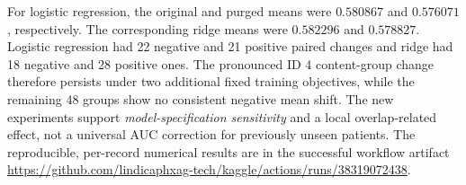 For logistic regression, the original and purged
means were $0.580867$ and $0.576071$,
respectively. The corresponding ridge means were
$0.582296$ and $0.578827$. Logistic regression
had 22 negative and 21 positive paired changes
and ridge had 18 negative and 28 positive ones.
The pronounced ID 4 content-group change
therefore persists under two additional fixed
training objectives, while the remaining
48 groups show no consistent negative mean shift.
The new experiments support
\emph{model-specification sensitivity} and a
local overlap-related effect, not a universal
AUC correction for previously unseen patients.
The reproducible, per-record numerical results
are in the successful workflow artifact
\url{https://github.com/lindicaphxag-tech/kaggle/actions/runs/38319072438}.
